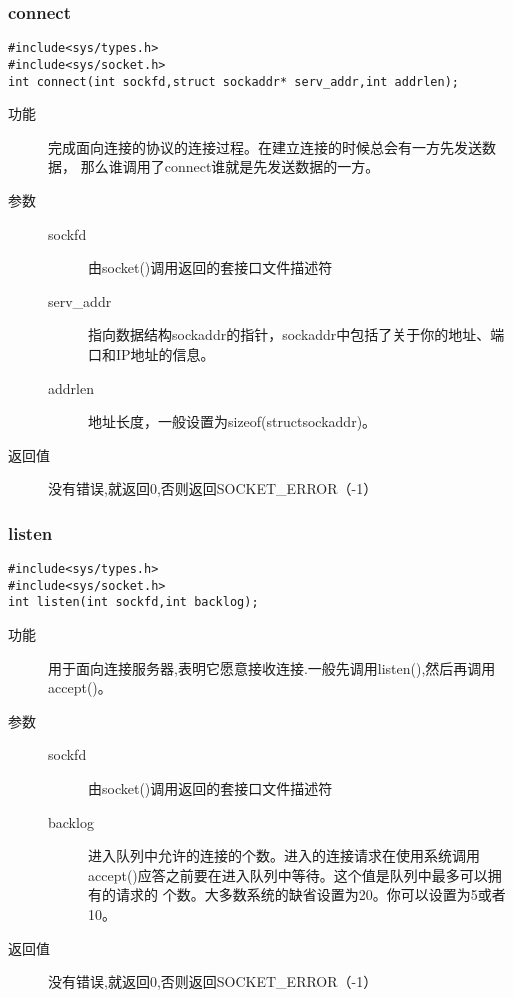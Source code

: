 \subsubsection{connect}
\begin{lstlisting}[style=C]
#include<sys/types.h>
#include<sys/socket.h>
int connect(int sockfd,struct sockaddr* serv_addr,int addrlen);
\end{lstlisting}
\begin{description}
\item[功能]	完成面向连接的协议的连接过程。在建立连接的时候总会有一方先发送数据，
那么谁调用了connect谁就是先发送数据的一方。
\item[参数]		 
\begin{description}
\item[sockfd]	由socket()调用返回的套接口文件描述符
\item[serv\_{}addr]	指向数据结构sockaddr的指针，sockaddr中包括了关于你的地址、端口和IP地址的信息。
\item[addrlen]	地址长度，一般设置为sizeof(structsockaddr)。
\end{description}
\item[返回值]		没有错误,就返回0,否则返回SOCKET\_{}ERROR（-1）
\end{description}


\subsubsection{listen}
\begin{lstlisting}[style=C]
#include<sys/types.h>
#include<sys/socket.h>
int listen(int sockfd,int backlog);
\end{lstlisting}
\begin{description}
\item[功能]	用于面向连接服务器,表明它愿意接收连接.一般先调用listen(),然后再调用accept()。
\item[参数]		 
\begin{description}
\item[sockfd]	由socket()调用返回的套接口文件描述符
\item[backlog]	进入队列中允许的连接的个数。进入的连接请求在使用系统调用
accept()应答之前要在进入队列中等待。这个值是队列中最多可以拥有的请求的
个数。大多数系统的缺省设置为20。你可以设置为5或者10。
\end{description}
\item[返回值]		没有错误,就返回0,否则返回SOCKET\_{}ERROR（-1）
\end{description}


